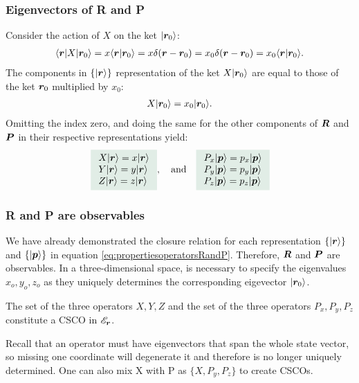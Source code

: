\subsubsection{Eigenvectors of R and P}
Consider the action of $X$ on the ket $|\bm{r}_0\rangle$:
\begin{align*}
    \langle\bm{r}|X|\bm{r}_0\rangle=x\langle\bm{r}|\bm{r}_0\rangle=x\delta(\bm{r}-\bm{r}_0)=x_0\delta(\bm{r}-\bm{r}_0)=x_0\langle\bm{r}|\bm{r}_0\rangle.
\end{align*}
The components in $\{|\bm{r}\rangle\}$ representation of the ket $X|\bm{r}_0\rangle$ are equal to those of the ket $\bm{r}_0$ multiplied by $x_0$:
\begin{align}
    X|\bm{r}_0\rangle=x_0|\bm{r}_0\rangle.
\end{align}
Omitting the index zero, and doing the same for the other components of $\bm{R}$ and $\bm{P}$ in their respective representations yield:
\begin{align}
    \highlight{\begin{array}{l}
        X\ket{\bR}=x\ket{\bR}\\
        Y\ket{\bR}=y\ket{\bR}\\
        Z\ket{\bR}=z\ket{\bR}
    \end{array}},\quad\text{and}\quad\highlight{\begin{array}{l}
        P_x\ket{\bp}=p_x\ket{\bp}\\
        P_y\ket{\bp}=p_y\ket{\bp}\\
        P_z\ket{\bp}=p_z\ket{\bp}
    \end{array}}
\end{align}
%
\subsubsection{R and P are observables}
We have already demonstrated the closure relation for each representation $\{|\bm{r}\rangle\}$ and $\{|\bm{p}\rangle\}$ in equation \eqref{eq:propertiesoperatorsRandP}. Therefore,
$\bm{R}$ and $\bm{P}$ are observables. In a three-dimensional space, is necessary to specify the eigenvalues $x_o,y_o,z_o$ as they uniquely determines the corresponding eigevector $|\bm{r}_0\rangle$.

\begin{emphasizer}
    The set of the three operators $X,Y,Z$ and the set of the three operators $P_x,P_y,P_z$  constitute a CSCO in $\mathscr{E}_{\bm{r}}$.
\end{emphasizer}
Recall that an operator must have eigenvectors that span the whole state vector, so missing one coordinate will degenerate it and therefore is no longer 
uniquely determined. One can also mix X with P as $\{X,P_y,P_z\}$ to create CSCOs.